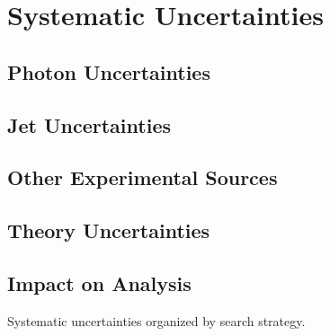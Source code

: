 \chapter{Systematic Uncertainties\label{ch:uncertainties}}

\section{Photon Uncertainties\label{sec:photonunc}}

\section{Jet Uncertainties\label{sec:jetunc}}

\section{Other Experimental Sources\label{sec:otherunc}}

\section{Theory Uncertainties\label{sec:theoryunc}}

\section{Impact on Analysis\label{sec:uncimpact}}

\begin{table}[ht]
  \centering
  \renewcommand{\arraystretch}{1.4}
  \caption{Systematic uncertainties organized by search strategy.}
  
  \label{table:systematics}
\end{table}
